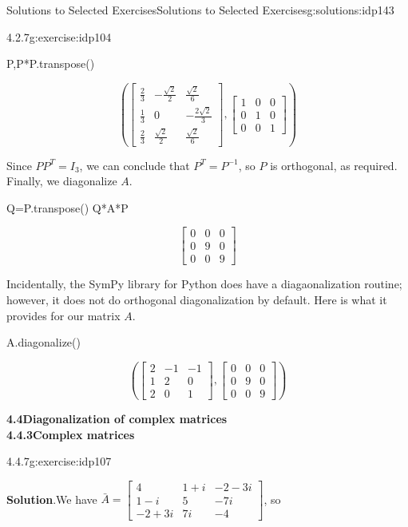 \documentclass[oneside,10pt,]{book}
\newcommand{\blocktitlefont}{\relax}
\numberwithin{equation}{section}
\newcommand{\bbm}{\begin{bmatrix}}
\newcommand{\ebm}{\end{bmatrix}}
\newcommand{\amp}{&}
\begin{document}
\begin{solutions-chapter}{Solutions to Selected Exercises}{}{Solutions to Selected Exercises}{}{}{g:solutions:idp143}
\begin{inlinesolution}{4.2.7}{}{g:exercise:idp104}
\begin{sageinput}
P,P*P.transpose()
\end{sageinput}
\begin{sageoutput}
\[\left(\bbm \frac23 \amp -\frac{\sqrt{2}}{2}\amp \frac{\sqrt{2}}{6}\\ \frac13\amp 0\amp -\frac{2\sqrt{2}}{3}\\ \frac23 \amp \frac{\sqrt{2}}{2} \amp \frac{\sqrt{2}}{6}\ebm,
\bbm 1\amp 0\amp 0\\0\amp 1\amp 0\\0\amp 0\amp 1\ebm\right)\]
\end{sageoutput}
Since \(PP^T=I_3\), we can conclude that \(P^T=P^{-1}\), so \(P\) is orthogonal, as required. Finally, we diagonalize \(A\).%
\begin{sageinput}
Q=P.transpose()
Q*A*P
\end{sageinput}
\begin{sageoutput}
\[\bbm 0\amp 0\amp 0\\0\amp 9\amp 0\\0\amp 0\amp 9\ebm\]
\end{sageoutput}
Incidentally, the SymPy library for Python does have a diagaonalization routine; however, it does not do orthogonal diagonalization by default. Here is what it provides for our matrix \(A\).%
\begin{sageinput}
A.diagonalize()
\end{sageinput}
\begin{sageoutput}
\[\left(\bbm 2\amp -1\amp -1\\1\amp 2\amp 0\\2\amp 0\amp 1\ebm, \bbm 0\amp 0\amp 0\\0\amp 9\amp 0\\0\amp 0\amp 9\ebm\right)\]
\end{sageoutput}
\end{inlinesolution}%
\par\medskip
\noindent\textbf{\Large{}4.4\space\textperiodcentered\space{}Diagonalization of complex matrices\\
4.4.3\space\textperiodcentered\space{}Complex matrices}
\begin{inlinesolution}{4.4.7}{}{g:exercise:idp107}%
\par\smallskip%
\noindent\textbf{\blocktitlefont Solution}.\hypertarget{g:solution:idp173-back}{}\quad{}We have \(\bar{A}=\bbm 4\amp 1+i\amp -2-3i\\1-i\amp 5 \amp -7i\\-2+3i\amp 7i\amp -4\ebm\), so%
\begin{equation*}

\end{equation*}
\end{inlinesolution}
\end{solutions-chapter}
\end{document}
